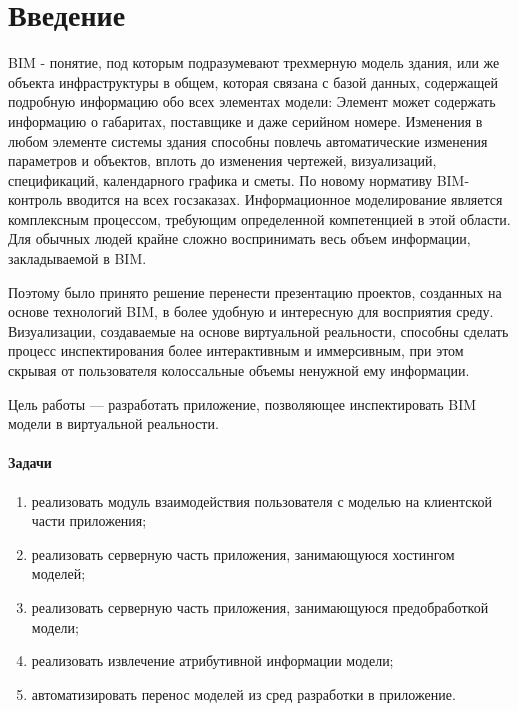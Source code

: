 ﻿
\section*{Введение}
BIM - понятие, под которым подразумевают трехмерную модель здания, или же объекта инфраструктуры в общем, которая связана с базой данных, 
содержащей подробную информацию обо всех элементах модели: Элемент может содержать информацию о габаритах, поставщике и даже серийном номере. 
Изменения в любом элементе системы здания способны повлечь автоматические изменения  параметров и объектов, 
вплоть до изменения чертежей, визуализаций, спецификаций, календарного графика и сметы. 
По новому нормативу BIM-контроль вводится на всех госзаказах. 
Информационное моделирование является комплексным процессом, требующим определенной компетенцией в этой области. 
Для обычных людей крайне сложно воспринимать весь объем информации, закладываемой в BIM.

Поэтому было принято решение перенести презентацию проектов, созданных на основе технологий BIM, в более удобную и интересную для восприятия среду. 
Визуализации, создаваемые на основе виртуальной реальности, способны сделать процесс инспектирования более интерактивным и иммерсивным, при этом скрывая от пользователя колоссальные объемы ненужной ему информации.

Цель работы — разработать приложение, позволяющее инспектировать BIM модели в виртуальной реальности.

\paragraph{Задачи}
\begin{enumerate}
    \item реализовать модуль взаимодействия пользователя с моделью на клиентской части приложения;
    \item реализовать серверную часть приложения, занимающуюся хостингом моделей;
    \item реализовать серверную часть приложения, занимающуюся предобработкой модели;
    \item реализовать извлечение атрибутивной информации модели;
    \item автоматизировать перенос моделей из сред разработки в приложение.
\end{enumerate}

